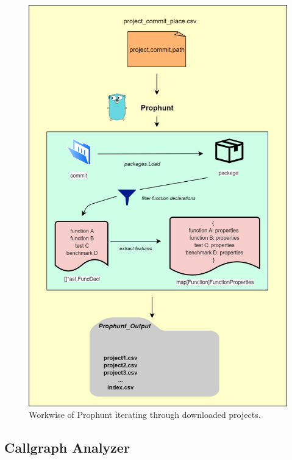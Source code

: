 \documentclass{seal_thesis}
\begin{document}
\begin{figure}[H]
	\centering
	\includegraphics[width=0.9\linewidth]{prophunt}
	\caption{Workwise of Prophunt iterating through downloaded projects.}
	\label{fig:prophunt}
\end{figure}


\subsection{Callgraph Analyzer}
\label{Callgraph Analyzer}
\end{document}
